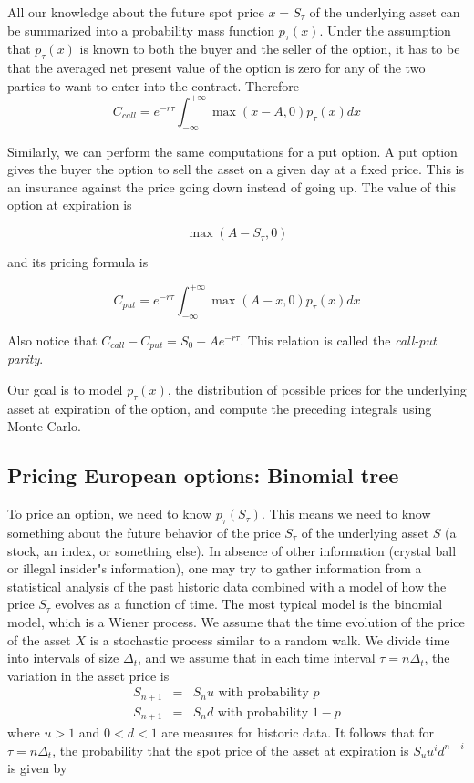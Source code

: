 \documentclass[justified, sixbynine]{tufte-book}
\theoremstyle{plain}%
\newtheorem * {corollary}{Corollary}
\theoremstyle{definition}
\theoremstyle{remark}
\newtheorem * {remark}{Remark}
\newtheorem * {note}{Note}
\begin{document}
\begin{fullwidth}
All our knowledge about the future spot price $x=S_\tau $ of the underlying
asset can be summarized into a probability mass function $p_\tau (x)$. Under
the assumption that $p_\tau (x)$ is known to both the buyer and the seller
of the option, it has to be that the averaged net present value of the
option is zero for any of the two parties to want to enter into the contract.
Therefore
\begin{equation}
C_{call}=e^{-r\tau }\int_{-\infty }^{+\infty }\max (x-A, 0)p_\tau (x)dx
\label{call_option}
\end{equation}


Similarly, we can perform the same computations for a put option. A put option gives the buyer the option to sell the asset on a given day at a fixed price. This is an insurance against the price going down instead of going up. The value of this option at expiration is

\begin{equation}
\max (A-S_\tau, 0)
\end{equation}

and its pricing formula is

\begin{equation}
C_{put}=e^{-r\tau }\int_{-\infty }^{+\infty }\max (A-x, 0)p_\tau (x)dx
\label{put_option}
\end{equation}

Also notice that $C_{call}-C_{put} = S_0 - A e^{-r\tau }$.
This relation is called the {\it call-put parity}.

Our goal is to model $p_\tau(x)$, the distribution of possible prices for the underlying asset at expiration of the option, and compute the preceding integrals using Monte Carlo.

\goodbreak\subsection{Pricing European options: Binomial tree}

To price an option, we need to know $p_\tau (S_\tau )$. This means we need to
know something about the future behavior of the price $S_\tau $ of the
underlying asset $S$ (a stock, an index, or something else). In absence of
other information (crystal ball or illegal insider"s information), one may
try to gather information from a statistical analysis of the past historic
data combined with a model of how the price $S_\tau $ evolves as a function of
time. The most typical model is the binomial model, which is a Wiener
process. We assume that the time evolution of the price of the asset $X$ is a
stochastic process similar to a random walk. We divide time into
intervals of size $\Delta _t$, and we assume that in each time interval $\tau
=n\Delta _t$, the variation in the asset price is
\begin{eqnarray}
S_{n+1} &=&S_nu\text{ with probability }p \\
S_{n+1} &=&S_nd\text{ with probability }1-p
\end{eqnarray}
where $u>1$ and $0<d<1$ are measures for historic data. It follows that for $%
\tau =n\Delta _t$, the probability that the spot price of the asset at
expiration is $S_uu^id^{n-i}$ is given by


\end{fullwidth}
\end{document}
